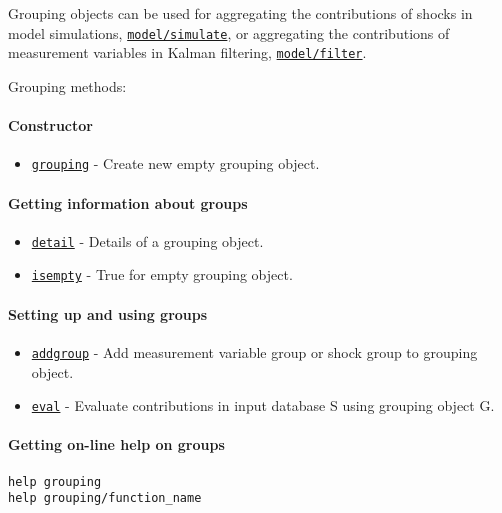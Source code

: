

	Grouping objects can be used for aggregating the contributions of shocks
in model simulations, \href{model/simulate}{\texttt{model/simulate}}, or
aggregating the contributions of measurement variables in Kalman
filtering, \href{model/filter}{\texttt{model/filter}}.

Grouping methods:

\paragraph{Constructor}

\begin{itemize}
\itemsep1pt\parskip0pt
\item
  \href{grouping/grouping}{\texttt{grouping}} - Create new empty
  grouping object.
\end{itemize}

\paragraph{Getting information about
groups}

\begin{itemize}
\itemsep1pt\parskip0pt
\item
  \href{grouping/detail}{\texttt{detail}} - Details of a grouping
  object.
\item
  \href{grouping/isempty}{\texttt{isempty}} - True for empty grouping
  object.
\end{itemize}

\paragraph{Setting up and using
groups}

\begin{itemize}
\itemsep1pt\parskip0pt
\item
  \href{grouping/addgroup}{\texttt{addgroup}} - Add measurement variable
  group or shock group to grouping object.
\item
  \href{grouping/eval}{\texttt{eval}} - Evaluate contributions in input
  database S using grouping object G.
\end{itemize}

\paragraph{Getting on-line help on
groups}

\begin{verbatim}
help grouping
help grouping/function_name
\end{verbatim}



